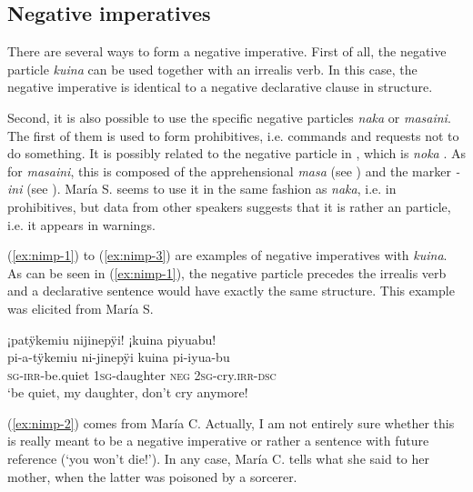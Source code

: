 
\subsection{Negative imperatives}\label{sec:Prohibitives}

There are several ways to form a negative imperative. First of all, the negative particle \textit{kuina} can be used together with an irrealis verb. In this case, the negative imperative is identical to a negative declarative clause in structure. 

Second, it is also possible to use the specific negative particles \textit{naka} or \textit{masaini}. The first of them is used to form prohibitives, i.e. commands and requests not to do something. It is possibly related to the negative particle in , which is \textit{noka} \citep[cf.][338]{Danielsen2007}. As for \textit{masaini}, this is composed of the apprehensional  \textit{masa} (see ) and the  marker \textit{-ini} (see ). María S. seems to use it in the same fashion as \textit{naka}, i.e. in prohibitives, but data from other speakers suggests that it is rather an  particle, i.e. it appears in warnings.

(\ref{ex:nimp-1}) to (\ref{ex:nimp-3}) are examples of negative imperatives with \textit{kuina}. As can be seen in (\ref{ex:nimp-1}), the negative particle precedes the irrealis verb and a declarative sentence would have exactly the same structure. This example was elicited from María S.

\ea\label{ex:nimp-1}
\begingl
\glpreamble ¡patÿkemiu nijinepÿi! ¡kuina piyuabu!\\
\gla pi-a-tÿkemiu ni-jinepÿi kuina pi-iyua-bu\\
\textsc{sg}-\textsc{irr}-be.quiet 1\textsc{sg}-daughter \textsc{neg} 2\textsc{sg}-cry.\textsc{irr}-\textsc{dsc}\\
\glft ‘be quiet, my daughter, don’t cry anymore!
\endgl
\trailingcitation{[mrx-e150219s.136]}
\xe

(\ref{ex:nimp-2}) comes from María C. Actually, I am not entirely sure whether this is really meant to be a negative imperative or rather a sentence with future reference (‘you won’t die!’). In any case, María C. tells what she said to her mother, when the latter was poisoned by a sorcerer.

